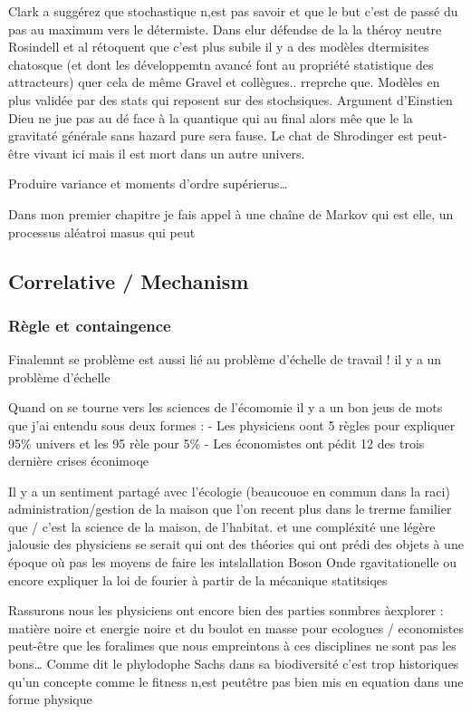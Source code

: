 Clark a suggérez que stochastique n,est pas savoir et que le but c'est
de passé du pas au maximum vers le détermiste. Dans elur défendse de la
la théroy neutre Rosindell et al rétoquent que c'est plus subile il y a
des modèles dtermisites chatosque (et dont les développemtn avancé font
au propriété statistique des attracteurs) quer cela de même Gravel et
collègues.. rreprche que. Modèles en plus validée par des stats qui
reposent sur des stochsiques. Argument d'Einstien Dieu ne jue pas au dé
face à la quantique qui au final alors mêe que le la gravitaté générale
sans hazard pure sera fause. Le chat de Shrodinger est peut-être vivant
ici mais il est mort dans un autre univers.

Produire variance et moments d'ordre supérierus\ldots{}

Dans mon premier chapitre je fais appel à une chaîne de Markov qui est
elle, un processus aléatroi masus qui peut

\subsection{Correlative / Mechanism}\label{correlative-mechanism}

\subsubsection{Règle et containgence}\label{ruxe8gle-et-containgence}

Finalemnt se problème est aussi lié au problème d'échelle de travail !
il y a un problème d'échelle

Quand on se tourne vers les sciences de l'écomomie il y a un bon jeus de
mots que j'ai entendu sous deux formes : - Les physiciens oont 5 règles
pour expliquer 95\% univers et les 95 rèle pour 5\% - Les économistes
ont pédit 12 des trois dernière crises éconimoqe

Il y a un sentiment partagé avec l'écologie (beaucouoe en commun dans la
raci) administration/gestion de la maison que l'on recent plus dans le
trerme familier que / c'est la science de la maison, de l'habitat. et
une compléxité une légère jalousie des physiciens se serait qui ont des
théories qui ont prédi des objets à une époque où pas les moyens de
faire les intslallation Boson Onde rgavitationelle ou encore expliquer
la loi de fourier à partir de la mécanique statitsiqes

Rassurons nous les physiciens ont encore bien des parties sonmbres
àexplorer : matière noire et energie noire et du boulot en masse pour
ecologues / economistes peut-être que les foralimes que nous empreintons
à ces disciplines ne sont pas les bons\ldots{} Comme dit le phylodophe
Sachs dans sa biodiversité c'est trop historiques qu'un concepte comme
le fitness n,est peutêtre pas bien mis en equation dans une forme
physique

